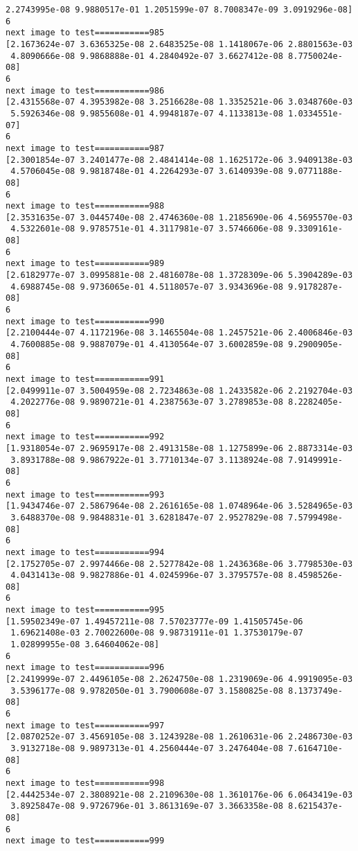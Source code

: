 \documentclass[11pt]{article}
\begin{document}
\begin{Verbatim}[commandchars=\\\{\}]
 2.2743995e-08 9.9880517e-01 1.2051599e-07 8.7008347e-09 3.0919296e-08]
6
next image to test===========985
[2.1673624e-07 3.6365325e-08 2.6483525e-08 1.1418067e-06 2.8801563e-03
 4.8090666e-08 9.9868888e-01 4.2840492e-07 3.6627412e-08 8.7750024e-08]
6
next image to test===========986
[2.4315568e-07 4.3953982e-08 3.2516628e-08 1.3352521e-06 3.0348760e-03
 5.5926346e-08 9.9855608e-01 4.9948187e-07 4.1133813e-08 1.0334551e-07]
6
next image to test===========987
[2.3001854e-07 3.2401477e-08 2.4841414e-08 1.1625172e-06 3.9409138e-03
 4.5706045e-08 9.9818748e-01 4.2264293e-07 3.6140939e-08 9.0771188e-08]
6
next image to test===========988
[2.3531635e-07 3.0445740e-08 2.4746360e-08 1.2185690e-06 4.5695570e-03
 4.5322601e-08 9.9785751e-01 4.3117981e-07 3.5746606e-08 9.3309161e-08]
6
next image to test===========989
[2.6182977e-07 3.0995881e-08 2.4816078e-08 1.3728309e-06 5.3904289e-03
 4.6988745e-08 9.9736065e-01 4.5118057e-07 3.9343696e-08 9.9178287e-08]
6
next image to test===========990
[2.2100444e-07 4.1172196e-08 3.1465504e-08 1.2457521e-06 2.4006846e-03
 4.7600885e-08 9.9887079e-01 4.4130564e-07 3.6002859e-08 9.2900905e-08]
6
next image to test===========991
[2.0499911e-07 3.5004959e-08 2.7234863e-08 1.2433582e-06 2.2192704e-03
 4.2022776e-08 9.9890721e-01 4.2387563e-07 3.2789853e-08 8.2282405e-08]
6
next image to test===========992
[1.9318054e-07 2.9695917e-08 2.4913158e-08 1.1275899e-06 2.8873314e-03
 3.8931788e-08 9.9867922e-01 3.7710134e-07 3.1138924e-08 7.9149991e-08]
6
next image to test===========993
[1.9434746e-07 2.5867964e-08 2.2616165e-08 1.0748964e-06 3.5284965e-03
 3.6488370e-08 9.9848831e-01 3.6281847e-07 2.9527829e-08 7.5799498e-08]
6
next image to test===========994
[2.1752705e-07 2.9974466e-08 2.5277842e-08 1.2436368e-06 3.7798530e-03
 4.0431413e-08 9.9827886e-01 4.0245996e-07 3.3795757e-08 8.4598526e-08]
6
next image to test===========995
[1.59502349e-07 1.49457211e-08 7.57023777e-09 1.41505745e-06
 1.69621408e-03 2.70022600e-08 9.98731911e-01 1.37530179e-07
 1.02899955e-08 3.64604062e-08]
6
next image to test===========996
[2.2419999e-07 2.4496105e-08 2.2624750e-08 1.2319069e-06 4.9919095e-03
 3.5396177e-08 9.9782050e-01 3.7900608e-07 3.1580825e-08 8.1373749e-08]
6
next image to test===========997
[2.0870252e-07 3.4569105e-08 3.1243928e-08 1.2610631e-06 2.2486730e-03
 3.9132718e-08 9.9897313e-01 4.2560444e-07 3.2476404e-08 7.6164710e-08]
6
next image to test===========998
[2.4442534e-07 2.3808921e-08 2.2109630e-08 1.3610176e-06 6.0643419e-03
 3.8925847e-08 9.9726796e-01 3.8613169e-07 3.3663358e-08 8.6215437e-08]
6
next image to test===========999

\end{Verbatim}
\end{document}
